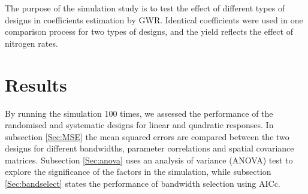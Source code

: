 \documentclass[a4paper]{article} 	%
\newcommand{\AR}{\mathrm{AR1}}
\begin{document}



The purpose of the simulation study is to test the effect of different types of designs in coefficients estimation by GWR. Identical coefficients were used in one comparison process for two types of designs, and the yield reflects the effect of nitrogen rates.  


\section{Results}\label{Sec:Res}

By running the simulation 100 times, we assessed the performance of the randomised and systematic designs for linear and quadratic responses. In subsection \ref{Sec:MSE} the mean squared errors are compared between the two designs for different bandwidths, parameter correlations and spatial covariance matrices. Subsection \ref{Sec:anova} uses an analysis of variance (ANOVA) test to explore the significance of the factors in the simulation, while subsection \ref{Sec:bandselect} states the performance of bandwidth selection using AICc. 
\end{document}
